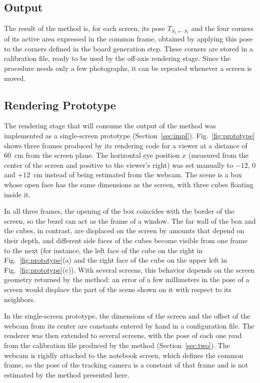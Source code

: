 \documentclass[english,hidelinks]{sbrt}
\begin{document}
\subsection{Output}
The result of the method is, for each screen, its pose $T_{S_1\leftarrow S_i}$ and the four corners of its active area expressed in the common frame, obtained by applying this pose to the corners defined in the board generation step. These corners are stored in a calibration file, ready to be used by the off-axis rendering stage. Since the procedure needs only a few photographs, it can be repeated whenever a screen is moved.

\subsection{Rendering Prototype}
\label{sec:proto}
The rendering stage that will consume the output of the method was implemented as a single-screen prototype (Section~\ref{sec:impl}). Fig.~\ref{fig:prototype} shows three frames produced by its rendering code for a viewer at a distance of 60~cm from the screen plane. The horizontal eye position $x$ (measured from the center of the screen and positive to the viewer's right) was set manually to $-12$, $0$ and $+12$~cm instead of being estimated from the webcam. The scene is a box whose open face has the same dimensions as the screen, with three cubes floating inside it.

In all three frames, the opening of the box coincides with the border of the screen, so the bezel can act as the frame of a window. The far wall of the box and the cubes, in contrast, are displaced on the screen by amounts that depend on their depth, and different side faces of the cubes become visible from one frame to the next (for instance, the left face of the cube on the right in Fig.~\ref{fig:prototype}(a) and the right face of the cube on the upper left in Fig.~\ref{fig:prototype}(c)). With several screens, this behavior depends on the screen geometry returned by the method: an error of a few millimeters in the pose of a screen would displace the part of the scene shown on it with respect to its neighbors.

In the single-screen prototype, the dimensions of the screen and the offset of the webcam from its center are constants entered by hand in a configuration file. The renderer was then extended to several screens, with the pose of each one read from the calibration file produced by the method (Section~\ref{sec:two}). The webcam is rigidly attached to the notebook screen, which defines the common frame, so the pose of the tracking camera is a constant of that frame and is not estimated by the method presented here.
\end{document}
